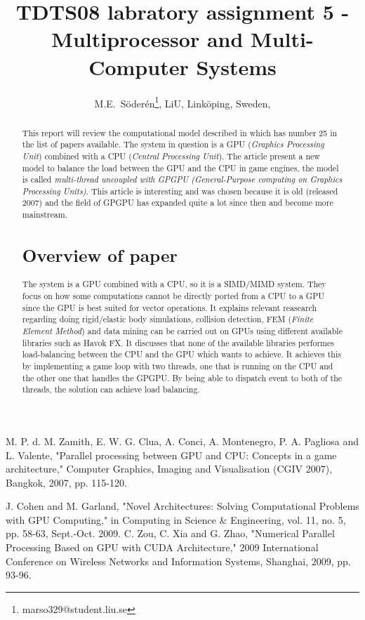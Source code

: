\documentclass[a4paper,
              ]{jacow}
\begin{document}
\title{TDTS08 labratory assignment 5 - Multiprocessor and Multi-Computer Systems}

\author{ M.E.~S\"{o}der\'{e}n\thanks{marso329@student.liu.se}, LiU, Linköping, Sweden,}

\maketitle
\begin{multicols}{2}
%
\begin{abstract}
\noindent
This report will review the computational model described in \cite{main} which has number 25 in the list of papers available. The system in question is a GPU (\textit{Graphics Processing Unit}) combined with a CPU (\textit{Central Processing Unit}). The article present a new model to balance the load between the GPU and the CPU in game engines, the model is called \textit{multi-thread uncoupled with GPGPU (General-Purpose computing on Graphics Processing Units)}. This article is interesting and was chosen because it is old (released 2007) and the field of GPGPU has expanded quite a lot since then and become more mainstream.

\section{Overview of paper}
\noindent
The system is a GPU combined with a CPU, so it is a SIMD/MIMD system. They focus on how some computations cannot be directly ported from a CPU to a GPU since the GPU is best suited for vector operations. It explains relevant reasearch regarding doing rigid/elastic body simulations, collision detection, FEM (\textit{Finite Element Method}) and data mining can be carried out on GPUs using different available libraries such as Havok FX. It discusses that none of the available libraries performes load-balancing between the CPU and the GPU which \cite{main} wants to achieve. It achieves this by implementing a game loop with two threads, one that is running on the CPU and the other one that handles the GPGPU. By being able to dispatch event to both of the threads, the solution can achieve load balancing.   

\end{abstract}

\begin{thebibliography}{99}
 M. P. d. M. Zamith, E. W. G. Clua, A. Conci, A. Montenegro, P. A. Pagliosa and L. Valente, "Parallel processing between GPU and CPU: Concepts in a game architecture," Computer Graphics, Imaging and Visualisation (CGIV 2007), Bangkok, 2007, pp. 115-120.

 J. Cohen and M. Garland, "Novel Architectures: Solving Computational Problems with GPU Computing," in Computing in Science \& Engineering, vol. 11, no. 5, pp. 58-63, Sept.-Oct. 2009.
 C. Zou, C. Xia and G. Zhao, "Numerical Parallel Processing Based on GPU with CUDA Architecture," 2009 International Conference on Wireless Networks and Information Systems, Shanghai, 2009, pp. 93-96.


\end{thebibliography}

\end{multicols}
\end{document}
